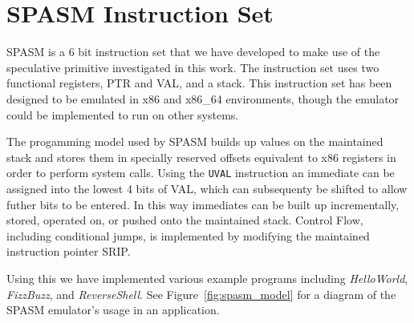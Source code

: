 \pagebreak
\section{SPASM Instruction Set}
\label{appendix:spasm}
\renewcommand{\thefootnote}{\fnsymbol{footnote}}

SPASM is a 6 bit instruction set that we have developed to make use of the 
speculative primitive investigated in this work. The instruction set uses two 
functional registers, PTR and VAL, and a stack. This instruction set has been 
designed to be emulated in x86 and x86\_64 environments, though the emulator 
could be implemented to run on other systems. 

The progamming model used by SPASM builds up values on the maintained stack
and stores them in specially reserved offsets equivalent to x86 registers 
in order to perform system calls. Using the \texttt{UVAL} instruction
an immediate can be assigned into the lowest 4 bits of VAL, which 
can subsequenty be shifted to allow futher bits to be entered. In this way
immediates can be built up incrementally, stored, operated on, or pushed 
onto the maintained stack. Control Flow, including conditional jumps, 
is implemented by modifying the maintained instruction pointer SRIP. 

Using this we have implemented various example programs including 
\textit{HelloWorld}, \textit{FizzBuzz}, and \textit{ReverseShell}.
See Figure~\ref{fig:spasm_model} for a diagram of the SPASM emulator's
usage in an \speculake application.


